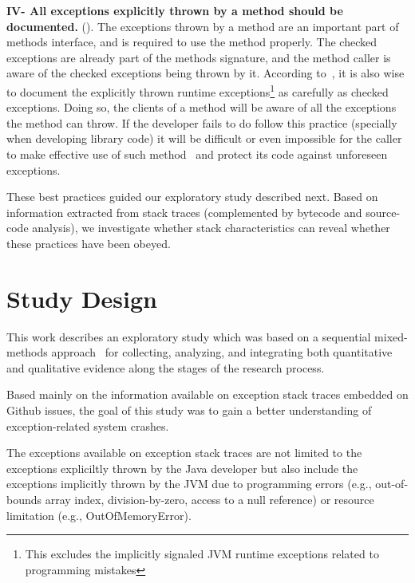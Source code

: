 \documentclass[conference]{IEEEtran}
\begin{document}

\textbf{IV- All exceptions explicitly thrown by a method should be documented.}
(\cite{mandrioli1992advances,gosling2000java,wirfs2006toward,bloch2008effective}).
The exceptions thrown by a method are an important part of methods interface,
and is required to use the method properly. The checked exceptions are already
part of the  methods signature, and the method caller is aware of the checked
exceptions being thrown by it. According to~\cite{bloch2008effective}, it is
also wise to document the explicitly thrown runtime exceptions\footnote{This
excludes the implicitly signaled JVM runtime exceptions related to programming
mistakes} as carefully as checked exceptions. Doing so, the clients of a method
will be aware of all the exceptions the method can throw. If the developer fails to
do follow this practice (specially when developing library code) it will be
difficult or even impossible for the caller to make effective use of such 
method~\cite{wirfs2006toward, bloch2008effective} and protect its code
against unforeseen exceptions. 

These best practices guided our exploratory study described next.
Based on information extracted from stack traces (complemented by
bytecode and source-code analysis), we investigate whether stack characteristics
can reveal whether these practices have been obeyed. 



\section{Study Design}

This work describes an exploratory study which was based on a sequential
mixed-methods approach~\cite{ivankova2006using} for collecting, analyzing, and
integrating both quantitative and qualitative evidence along the stages of the
research process. 

Based mainly on the information available on exception stack traces embedded 
on Github issues, the goal of this study was to gain a better understanding 
of exception-related system crashes.

The exceptions available on exception stack traces are not limited to the exceptions 
expliciltly thrown by the Java developer but also include
the exceptions implicitly thrown by the JVM due to programming errors (e.g., out-of-bounds array index, division-by-zero, 
access to a null reference) or resource limitation (e.g., OutOfMemoryError). 
\end{document}
